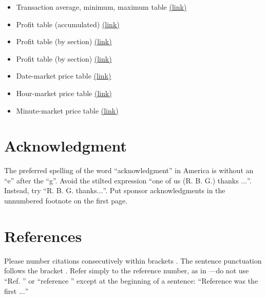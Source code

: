 \documentclass[conference]{IEEEtran}
\begin{document}
\begin{itemize}

\item Transaction average, minimum, maximum table \href{https://github.com/kimsangwond/bithumb_bot/blob/master/sangw on_code/table/avg%2C%20min%2C%20max_table.csv}{(link)}

\item 
Profit table (accumulated) \href{https://github.com/kimsangwond/bithumb_bot/blob/master/sangw on_code/table/profit_table.csv}{(link)}

\item 
Profit table (by section) \href{https://github.com/kimsangwond/bithumb_bot/blob/master/sangw on_code/table/profit_table2.csv}{(link)}

\item 
Profit table (by section) \href{https://github.com/kimsangwond/bithumb_bot/blob/master/sangw on_code/table/profit_table2.csv}{(link)}

\item 
Date-market price table \href{https://github.com/kimsangwond/bithumb_bot/blob/master/hamin _code/table/date_result_table.csv}{(link)}

\item 
Hour-market price table \href{https://github.com/kimsangwond/bithumb_bot/blob/master/hamin _code/table/hour_result_table.csv}{(link)}

\item 
Minute-market price table \href{https://github.com/kimsangwond/bithumb_bot/blob/master/hamin
_code/table/minute_result_table.csv}{(link)}
\end{itemize}

\section*{Acknowledgment}

The preferred spelling of the word ``acknowledgment'' in America is without 
an ``e'' after the ``g''. Avoid the stilted expression ``one of us (R. B. 
G.) thanks $\ldots$''. Instead, try ``R. B. G. thanks$\ldots$''. Put sponsor 
acknowledgments in the unnumbered footnote on the first page.

\section*{References}

Please number citations consecutively within brackets \cite{b1}. The 
sentence punctuation follows the bracket \cite{b2}. Refer simply to the reference 
number, as in \cite{b3}---do not use ``Ref. \cite{b3}'' or ``reference \cite{b3}'' except at 
the beginning of a sentence: ``Reference \cite{b3} was the first $\ldots$''
\end{document}
